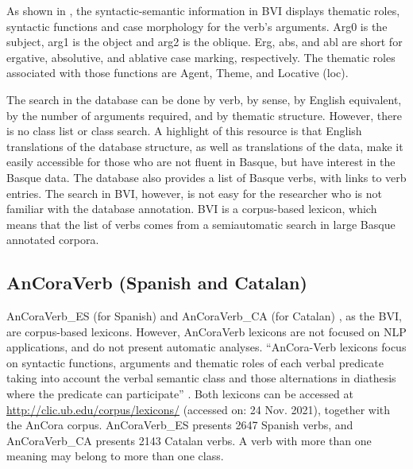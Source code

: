 \documentclass[english]{textolivre}
\begin{document}
As shown in , the syntactic-semantic information in BVI displays thematic roles, syntactic functions and case morphology for the verb’s arguments. Arg0 is the subject, arg1 is the object and arg2 is the oblique. Erg, abs, and abl are short for ergative, absolutive, and ablative case marking, respectively. The thematic roles associated with those functions are Agent, Theme, and Locative (loc).

The search in the database can be done by verb, by sense, by English equivalent, by the number of arguments required, and by thematic structure. However, there is no class list or class search. A highlight of this resource is that English translations of the database structure, as well as translations of the data, make it easily accessible for those who are not fluent in Basque, but have interest in the Basque data. The database also provides a list of Basque verbs, with links to verb entries. The search in BVI, however, is not easy for the researcher who is not familiar with the database annotation. BVI is a corpus-based lexicon, which means that the list of verbs comes from a semiautomatic search in large Basque annotated corpora.


\subsection{AnCoraVerb (Spanish and Catalan)}

AnCoraVerb\_ES (for Spanish) and AnCoraVerb\_CA (for Catalan) \cite{aparicio_ancora-verb:_2008,taule_ancora-net:_2010}, as the BVI, are corpus-based lexicons. However, AnCoraVerb lexicons are not focused on NLP applications, and do not present automatic analyses. “AnCora-Verb lexicons focus on syntactic functions, arguments and thematic roles of each verbal predicate taking into account the verbal semantic class and those alternations in diathesis where the predicate can participate” \cite[p.~261]{aparicio_ancora-verb:_2008}. Both lexicons can be accessed at \url{http://clic.ub.edu/corpus/lexicons/} (accessed on: 24 Nov. 2021), together with the AnCora corpus. AnCoraVerb\_ES presents 2647 Spanish verbs, and AnCoraVerb\_CA presents 2143 Catalan verbs. A verb with more than one meaning may belong to more than one class.
\end{document}
